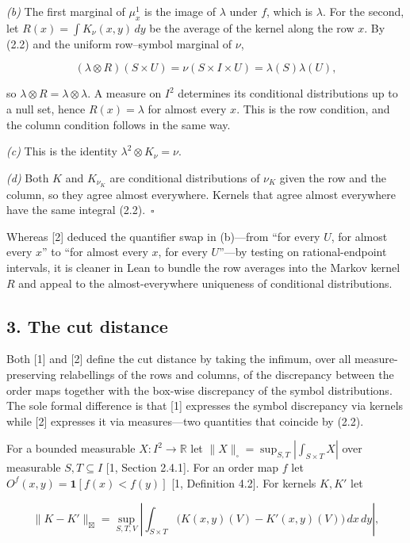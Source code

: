 \documentclass[english,11pt,a4paper]{article}
\begin{document}
\emph{(b)} The first marginal of \(\mu^1_x\) is the image of \(\lambda\) under \(f\), which is \(\lambda\). For the second, let \(R(x)=\int K_\nu(x,y)\,dy\) be the average of the kernel along the row \(x\). By (2.2) and the uniform row--symbol marginal of \(\nu\),

\nopagebreak[4]
\[(\lambda\otimes R)(S\times U)=\nu(S\times I\times U)=\lambda(S)\lambda(U),\]

so \(\lambda\otimes R=\lambda\otimes\lambda\). A measure on \(I^2\) determines its conditional distributions up to a null set, hence \(R(x)=\lambda\) for almost every \(x\). This is the row condition, and the column condition follows in the same way.

\emph{(c)} This is the identity \(\lambda^2\otimes K_\nu=\nu\).

\emph{(d)} Both \(K\) and \(K_{\nu_K}\) are conditional distributions of \(\nu_K\) given the row and the column, so they agree almost everywhere. Kernels that agree almost everywhere have the same integral (2.2).~\(\square\)

Whereas {[}2{]} deduced the quantifier swap in (b)---from ``for every \(U\), for almost every \(x\)'' to ``for almost every \(x\), for every \(U\)''---by testing on rational-endpoint intervals, it is cleaner in Lean to bundle the row averages into the Markov kernel \(R\) and appeal to the almost-everywhere uniqueness of conditional distributions.

\subsection{3. The cut distance}\label{the-cut-distance}

Both {[}1{]} and {[}2{]} define the cut distance by taking the infimum, over all measure-preserving relabellings of the rows and columns, of the discrepancy between the order maps together with the box-wise discrepancy of the symbol distributions. The sole formal difference is that {[}1{]} expresses the symbol discrepancy via kernels while {[}2{]} expresses it via measures---two quantities that coincide by (2.2).

For a bounded measurable \(X:I^2\to\mathbb R\) let \(\|X\|_\square=\sup_{S,T}|\int_{S\times T}X|\) over measurable \(S,T\subseteq I\) {[}1, Section 2.4.1{]}. For an order map \(f\) let \(O^f(x,y)=\mathbf 1[f(x)<f(y)]\) {[}1, Definition 4.2{]}. For kernels \(K,K'\) let

\nopagebreak[4]
\[\|K-K'\|_{\boxtimes}=\sup_{S,T,V}\left|\int_{S\times T}\bigl(K(x,y)(V)-K'(x,y)(V)\bigr)\,dx\,dy\right|,\tag{3.1}\]
\end{document}

